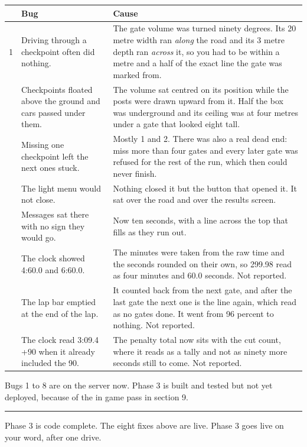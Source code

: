 \documentclass[11pt,a4paper]{article}
\begin{document}
\begin{longtable}{@{}p{6mm}p{72mm}p{74mm}@{}}
\toprule
& \textbf{Bug} & \textbf{Cause} \\
\midrule
\endhead
1 & Driving through a checkpoint often did nothing.
  & The gate volume was turned ninety degrees. Its 20 metre width ran
    \emph{along} the road and its 3 metre depth ran \emph{across} it, so you had
    to be within a metre and a half of the exact line the gate was marked from. \\
\addlinespace
2 & Checkpoints floated above the ground and cars passed under them.
  & The volume sat centred on its position while the posts were drawn upward
    from it. Half the box was underground and its ceiling was at four metres
    under a gate that looked eight tall. \\
\addlinespace
3 & Missing one checkpoint left the next ones stuck.
  & Mostly 1 and 2. There was also a real dead end: miss more than four gates
    and every later gate was refused for the rest of the run, which then could
    never finish. \\
\addlinespace
4 & The light menu would not close.
  & Nothing closed it but the button that opened it. It sat over the road and
    over the results screen. \\
\addlinespace
5 & Messages sat there with no sign they would go.
  & Now ten seconds, with a line across the top that fills as they run out. \\
\addlinespace
6 & The clock showed 4:60.0 and 6:60.0.
  & The minutes were taken from the raw time and the seconds rounded on their
    own, so 299.98 read as four minutes and 60.0 seconds. Not reported. \\
\addlinespace
7 & The lap bar emptied at the end of the lap.
  & It counted back from the next gate, and after the last gate the next one is
    the line again, which read as no gates done. It went from 96 percent to
    nothing. Not reported. \\
\addlinespace
8 & The clock read 3:09.4 +90 when it already included the 90.
  & The penalty total now sits with the cut count, where it reads as a tally
    and not as ninety more seconds still to come. Not reported. \\
\bottomrule
\end{longtable}

Bugs 1 to 8 are on the server now. Phase 3 is built and tested but not yet
deployed, because of the in game pass in section 9.

\vspace{10pt}
\hrule
\vspace{6pt}

{\small Phase 3 is code complete. The eight fixes above are live. Phase 3 goes
live on your word, after one drive.}
\end{document}
